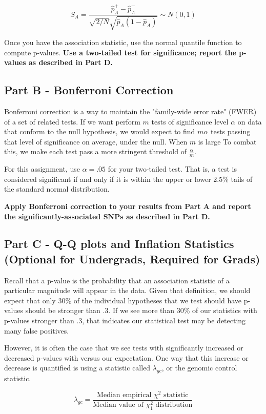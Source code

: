 \documentclass{article}
\begin{document}
$$ S_A = \frac{\hat p^+_A - \hat p^-_A}{\sqrt{2/N}\sqrt{\hat p_A(1 - \hat p_A)}} \sim N(0,1)$$

Once you have the association statistic, use the normal
quantile function to compute p-values. \textbf{Use a two-tailed test for
significance; report the p-values as described in Part D.}


\subsection*{Part B - Bonferroni Correction}
Bonferroni correction is a way to maintain the "family-wide error rate"
(FWER) of a set of related tests.
If we want perform $m$ tests of significance level $\alpha$ on 
data that conform to the null hypothesis, we would expect to find $m\alpha$ tests
passing that level of significance on average, under the null.  When $m$ is large
To combat this, we make each test pass a more
stringent threshold of $\frac{\alpha}{m}$.

For this assignment, use $\alpha = .05$ for your two-tailed test. That is, 
a test is considered significant if and only if it is within the upper
or lower 2.5\% tails of the standard normal distribution.

\textbf{Apply Bonferroni correction to your results from Part A
and report the significantly-associated SNPs as described in Part D.}

\vspace{1.5 cm}

\subsection*{Part C - Q-Q plots and Inflation Statistics (Optional for Undergrads, Required for Grads)}
Recall that a p-value is the probability that an association statistic
of a particular magnitude will appear in the data. Given that definition,
we should expect that only 30\% of the individual hypotheses
that we test should have p-values should be stronger than .3. 
If we see more than 30\% of our statistics with p-values stronger than .3,
that indicates our statistical test may be detecting many false positives.

However, it is often the case that we see tests with significantly
increased or decreased p-values with versus our expectation. One way
that this increase or decrease is quantified is using 
a statistic called $\lambda_{gc}$, or the genomic control statistic.

$$\lambda_{gc} = \frac{\text{Median empirical } \chi^2 \text{ statistic}}{\text{Median value of }\chi^2_1 \text{ distribution}}$$
\end{document}
